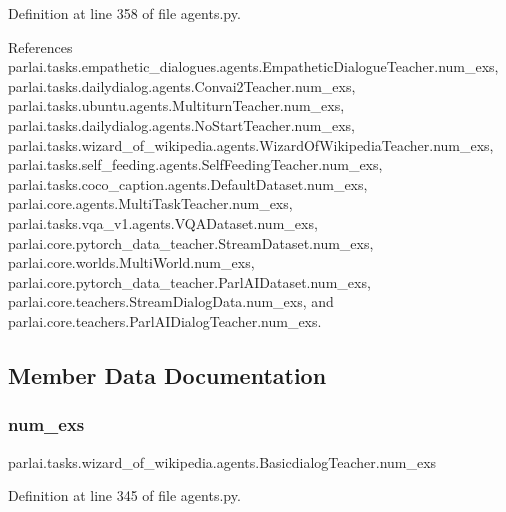 Definition at line 358 of file agents.\+py.



References parlai.\+tasks.\+empathetic\+\_\+dialogues.\+agents.\+Empathetic\+Dialogue\+Teacher.\+num\+\_\+exs, parlai.\+tasks.\+dailydialog.\+agents.\+Convai2\+Teacher.\+num\+\_\+exs, parlai.\+tasks.\+ubuntu.\+agents.\+Multiturn\+Teacher.\+num\+\_\+exs, parlai.\+tasks.\+dailydialog.\+agents.\+No\+Start\+Teacher.\+num\+\_\+exs, parlai.\+tasks.\+wizard\+\_\+of\+\_\+wikipedia.\+agents.\+Wizard\+Of\+Wikipedia\+Teacher.\+num\+\_\+exs, parlai.\+tasks.\+self\+\_\+feeding.\+agents.\+Self\+Feeding\+Teacher.\+num\+\_\+exs, parlai.\+tasks.\+coco\+\_\+caption.\+agents.\+Default\+Dataset.\+num\+\_\+exs, parlai.\+core.\+agents.\+Multi\+Task\+Teacher.\+num\+\_\+exs, parlai.\+tasks.\+vqa\+\_\+v1.\+agents.\+V\+Q\+A\+Dataset.\+num\+\_\+exs, parlai.\+core.\+pytorch\+\_\+data\+\_\+teacher.\+Stream\+Dataset.\+num\+\_\+exs, parlai.\+core.\+worlds.\+Multi\+World.\+num\+\_\+exs, parlai.\+core.\+pytorch\+\_\+data\+\_\+teacher.\+Parl\+A\+I\+Dataset.\+num\+\_\+exs, parlai.\+core.\+teachers.\+Stream\+Dialog\+Data.\+num\+\_\+exs, and parlai.\+core.\+teachers.\+Parl\+A\+I\+Dialog\+Teacher.\+num\+\_\+exs.



\subsection{Member Data Documentation}
\mbox{\label{classparlai_1_1tasks_1_1wizard__of__wikipedia_1_1agents_1_1BasicdialogTeacher_ab4f662982ef3d074d3d813f53d300ca4}} 
\subsubsection{\texorpdfstring{num\+\_\+exs}{num\_exs}}
{\footnotesize\ttfamily parlai.\+tasks.\+wizard\+\_\+of\+\_\+wikipedia.\+agents.\+Basicdialog\+Teacher.\+num\+\_\+exs}



Definition at line 345 of file agents.\+py.


